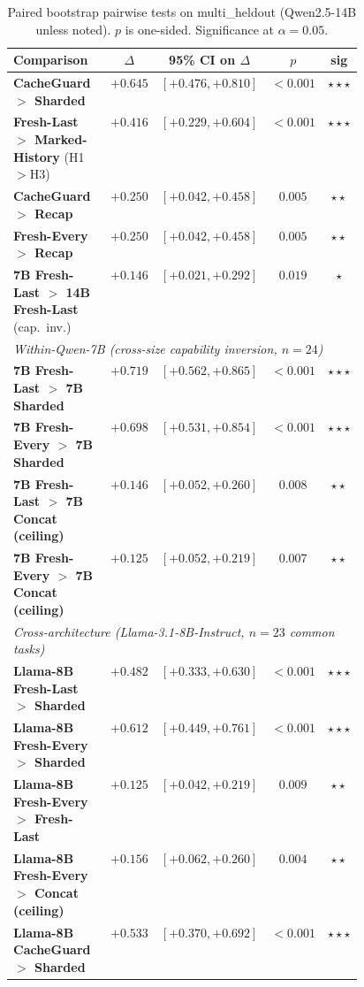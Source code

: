 \documentclass{article}
\begin{document}
\begin{table}[h]
\centering
\caption{Paired bootstrap pairwise tests on multi\_heldout (Qwen2.5-14B unless noted). $p$ is one-sided. Significance at $\alpha=0.05$.}
\label{tab:paired}
\small
\begin{tabular}{p{0.46\linewidth}cccc}
\toprule
Comparison & $\Delta$ & 95\% CI on $\Delta$ & $p$ & sig \\
\midrule
\textbf{CacheGuard $>$ Sharded} & $+0.645$ & $[+0.476, +0.810]$ & $<0.001$ & $\star\star\star$ \\
\textbf{Fresh-Last $>$ Marked-History} (H1$>$H3) & $+0.416$ & $[+0.229, +0.604]$ & $<0.001$ & $\star\star\star$ \\
\textbf{CacheGuard $>$ Recap} & $+0.250$ & $[+0.042, +0.458]$ & $0.005$ & $\star\star$ \\
\textbf{Fresh-Every $>$ Recap} & $+0.250$ & $[+0.042, +0.458]$ & $0.005$ & $\star\star$ \\
\textbf{7B Fresh-Last $>$ 14B Fresh-Last} (cap.\ inv.) & $+0.146$ & $[+0.021, +0.292]$ & $0.019$ & $\star$ \\
\midrule
\multicolumn{5}{l}{\textit{Within-Qwen-7B (cross-size capability inversion, $n=24$)}} \\
\textbf{7B Fresh-Last $>$ 7B Sharded} & $+0.719$ & $[+0.562, +0.865]$ & $<0.001$ & $\star\star\star$ \\
\textbf{7B Fresh-Every $>$ 7B Sharded} & $+0.698$ & $[+0.531, +0.854]$ & $<0.001$ & $\star\star\star$ \\
\textbf{7B Fresh-Last $>$ 7B Concat (ceiling)} & $+0.146$ & $[+0.052, +0.260]$ & $0.008$ & $\star\star$ \\
\textbf{7B Fresh-Every $>$ 7B Concat (ceiling)} & $+0.125$ & $[+0.052, +0.219]$ & $0.007$ & $\star\star$ \\
\midrule
\multicolumn{5}{l}{\textit{Cross-architecture (Llama-3.1-8B-Instruct, $n=23$ common tasks)}} \\
\textbf{Llama-8B Fresh-Last $>$ Sharded} & $+0.482$ & $[+0.333, +0.630]$ & $<0.001$ & $\star\star\star$ \\
\textbf{Llama-8B Fresh-Every $>$ Sharded} & $+0.612$ & $[+0.449, +0.761]$ & $<0.001$ & $\star\star\star$ \\
\textbf{Llama-8B Fresh-Every $>$ Fresh-Last} & $+0.125$ & $[+0.042, +0.219]$ & $0.009$ & $\star\star$ \\
\textbf{Llama-8B Fresh-Every $>$ Concat (ceiling)} & $+0.156$ & $[+0.062, +0.260]$ & $0.004$ & $\star\star$ \\
\textbf{Llama-8B CacheGuard $>$ Sharded} & $+0.533$ & $[+0.370, +0.692]$ & $<0.001$ & $\star\star\star$ \\

\end{tabular}
\end{table}
\end{document}
